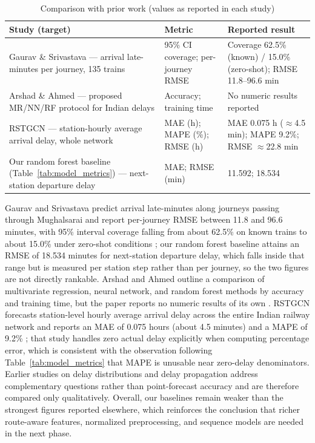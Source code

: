 \documentclass[12pt,a4paper]{report}
\begin{document}
\begin{table}[H]
\centering
\caption{Comparison with prior work (values as reported in each study)}
\label{tab:prior_comparison}
\small
\setlength{\tabcolsep}{4pt}
\begin{tabular}{p{}p{}p{}}
\toprule
Study (target) & Metric & Reported result \\
\midrule
Gaurav \& Srivastava \cite{gaurav2018zeroshot} --- arrival late-minutes per journey, 135 trains & 95\% CI coverage; per-journey RMSE & Coverage 62.5\% (known) / 15.0\% (zero-shot); RMSE 11.8--96.6 min \\
Arshad \& Ahmed \cite{arshad2019prediction} --- proposed MR/NN/RF protocol for Indian delays & Accuracy; training time & No numeric results reported \\
RSTGCN \cite{chowdhury2025rstgcn} --- station-hourly average arrival delay, whole network & MAE (h); MAPE (\%); RMSE (h) & MAE 0.075 h ($\approx$4.5 min); MAPE 9.2\%; RMSE $\approx$22.8 min \\
\midrule
Our random forest baseline (Table~\ref{tab:model_metrics}) --- next-station departure delay & MAE; RMSE (min) & 11.592; 18.534 \\
\bottomrule
\end{tabular}
\end{table}

Gaurav and Srivastava predict arrival late-minutes along journeys passing through Mughalsarai and report per-journey RMSE between 11.8 and 96.6 minutes, with 95\% interval coverage falling from about 62.5\% on known trains to about 15.0\% under zero-shot conditions \cite{gaurav2018zeroshot}; our random forest baseline attains an RMSE of 18.534 minutes for next-station departure delay, which falls inside that range but is measured per station step rather than per journey, so the two figures are not directly rankable. Arshad and Ahmed outline a comparison of multivariate regression, neural network, and random forest methods by accuracy and training time, but the paper reports no numeric results of its own \cite{arshad2019prediction}. RSTGCN forecasts station-level hourly average arrival delay across the entire Indian railway network and reports an MAE of 0.075 hours (about 4.5 minutes) and a MAPE of 9.2\% \cite{chowdhury2025rstgcn}; that study handles zero actual delay explicitly when computing percentage error, which is consistent with the observation following Table~\ref{tab:model_metrics} that MAPE is unusable near zero-delay denominators. Earlier studies on delay distributions and delay propagation \cite{oneto2018train,flier2009delay,goverde2010railway} address complementary questions rather than point-forecast accuracy and are therefore compared only qualitatively. Overall, our baselines remain weaker than the strongest figures reported elsewhere, which reinforces the conclusion that richer route-aware features, normalized preprocessing, and sequence models are needed in the next phase.
\end{document}
